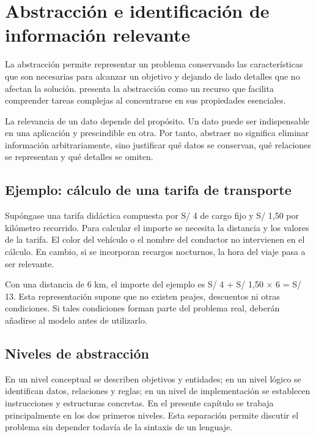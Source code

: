 \section{Abstracción e identificación de información relevante}

La abstracción permite representar un problema conservando las características que son necesarias para alcanzar un objetivo y dejando de lado detalles que no afectan la solución. \textcite[p.~49]{farrell2013} presenta la abstracción como un recurso que facilita comprender tareas complejas al concentrarse en sus propiedades esenciales.

La relevancia de un dato depende del propósito. Un dato puede ser indispensable en una aplicación y prescindible en otra. Por tanto, abstraer no significa eliminar información arbitrariamente, sino justificar qué datos se conservan, qué relaciones se representan y qué detalles se omiten.

\subsection{Ejemplo: cálculo de una tarifa de transporte}

Supóngase una tarifa didáctica compuesta por S/ 4 de cargo fijo y S/ 1,50 por kilómetro recorrido. Para calcular el importe se necesita la distancia y los valores de la tarifa. El color del vehículo o el nombre del conductor no intervienen en el cálculo. En cambio, si se incorporan recargos nocturnos, la hora del viaje pasa a ser relevante.



Con una distancia de 6 km, el importe del ejemplo es S/ 4 + S/ 1,50 × 6 = S/ 13. Esta representación supone que no existen peajes, descuentos ni otras condiciones. Si tales condiciones forman parte del problema real, deberán añadirse al modelo antes de utilizarlo.

\subsection{Niveles de abstracción}

En un nivel conceptual se describen objetivos y entidades; en un nivel lógico se identifican datos, relaciones y reglas; en un nivel de implementación se establecen instrucciones y estructuras concretas. En el presente capítulo se trabaja principalmente en los dos primeros niveles. Esta separación permite discutir el problema sin depender todavía de la sintaxis de un lenguaje.

